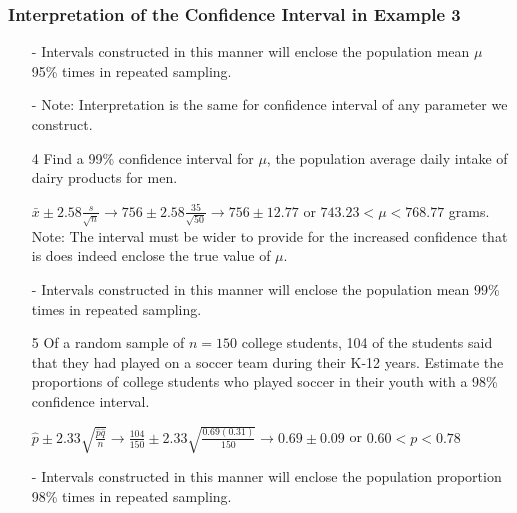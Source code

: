 \documentclass[12pt, letterpaper]{article}
\begin{document}
            \subsubsection*{Interpretation of the Confidence Interval in Example 3}
                \begin{itemize}
                    \item[-] Intervals constructed in this manner will enclose the population mean $\mu$ 95\% times in repeated sampling.
                    \item[-] Note: Interpretation is the same for confidence interval of any parameter we construct.
                \end{itemize}
                \begin{itemize}
                    \item[4] Find a 99\% confidence interval for $\mu$, the population average daily intake of dairy products for men.
                    \begin{mdframed}[leftmargin=0.5cm, rightmargin=0.5cm]
                        $\bar{x} \pm 2.58 \frac{s}{\sqrt{n}} \rightarrow 756 \pm 2.58 \frac{35}{\sqrt{50}} \rightarrow 756\pm 12.77$ or $743.23 < \mu < 768.77$ grams.
                        Note: The interval must be wider to provide for the increased confidence that is does indeed enclose the true value of $\mu$.
                    \end{mdframed}
                    \item[-] Intervals constructed in this manner will enclose the population mean 99\% times in repeated sampling.
                    \item[5] Of a random sample of $n = 150$ college students, 104 of the students said that they had played on a soccer team during their K-12 years. Estimate the proportions of college students who played soccer in their youth with a 98\% confidence interval.
                    \begin{mdframed}[leftmargin=0.5cm, rightmargin=0.5cm]
                        $\hat{p} \pm 2.33\sqrt{\frac{\hat{p}\hat{q}}{n}} \rightarrow \frac{104}{150} \pm 2.33 \sqrt{\frac{0.69(0.31)}{150}} \rightarrow 0.69\pm 0.09$ or $0.60 < p < 0.78$
                    \end{mdframed}
                    \item[-] Intervals constructed in this manner will enclose the population proportion 98\% times in repeated sampling.
                \end{itemize}
\end{document}
